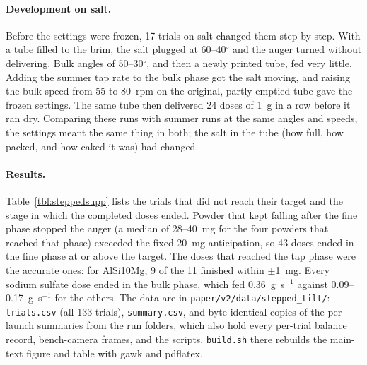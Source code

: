 \documentclass[10pt]{article}
\begin{document}
\paragraph{Development on salt.} Before the settings were frozen, 17 trials on
salt changed them step by step. With a tube filled to the brim, the salt plugged
at 60--40$^\circ$ and the auger turned without delivering. Bulk angles of
50--30$^\circ$, and then a newly printed tube, fed very little. Adding the summer
tap rate to the bulk phase got the salt moving, and raising the bulk speed from
55 to 80~rpm on the original, partly emptied tube gave the frozen settings. The
same tube then delivered 24 doses of 1~g in a row before it ran dry. Comparing
these runs with summer runs at the same angles and speeds, the settings meant the
same thing in both; the salt in the tube (how full, how packed, and how caked it
was) had changed.

\paragraph{Results.} Table~\ref{tbl:steppedsupp} lists the trials that did not
reach their target and the stage in which the completed doses ended. Powder
that kept falling after the fine phase stopped the auger (a median of 28--40~mg
for the four powders that reached that phase) exceeded the fixed 20~mg
anticipation, so 43 doses ended in the fine phase at or above the target. The
doses that reached the tap phase were the accurate ones: for AlSi10Mg, 9 of the
11 finished within $\pm$1~mg. Every sodium sulfate dose ended in the bulk phase,
which fed 0.36~g~s$^{-1}$ against 0.09--0.17~g~s$^{-1}$ for the others. The data
are in \texttt{paper/v2/data/stepped\_tilt/}: \texttt{trials.csv} (all 133
trials), \texttt{summary.csv}, and byte-identical copies of the per-launch
summaries from the run folders, which also hold every per-trial balance record,
bench-camera frames, and the scripts. \texttt{build.sh} there rebuilds the main-text
figure and table with gawk and pdflatex.
\end{document}

